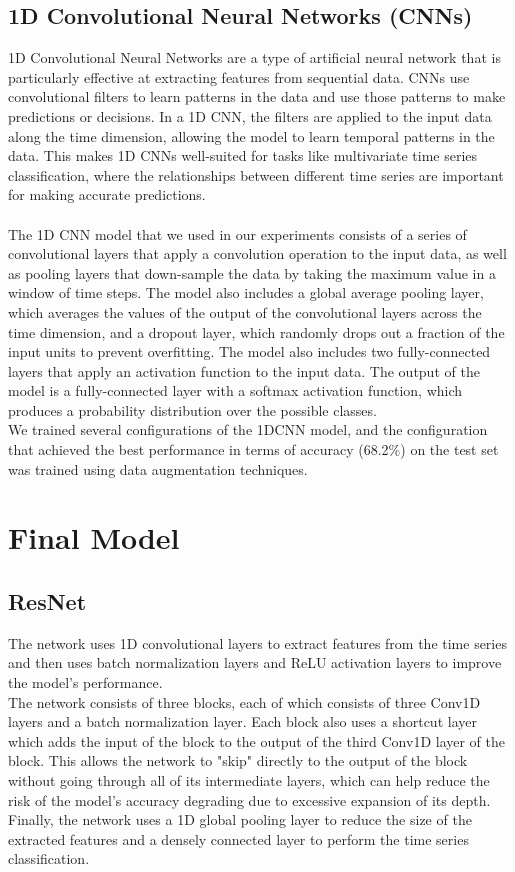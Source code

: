 \documentclass[11pt, oneside]{article}
\begin{document}
\subsection{1D Convolutional Neural Networks (CNNs)}
1D Convolutional Neural Networks are a type of artificial neural network that is particularly effective at extracting features from sequential data. CNNs use convolutional filters to learn patterns in the data and use those patterns to make predictions or decisions. In a 1D CNN, the filters are applied to the input data along the time dimension, allowing the model to learn temporal patterns in the data. This makes 1D CNNs well-suited for tasks like multivariate time series classification, where the relationships between different time series are important for making accurate predictions.\\\\
The 1D CNN model that we used in our experiments consists of a series of convolutional layers that apply a convolution operation to the input data, as well as pooling layers that down-sample the data by taking the maximum value in a window of time steps. The model also includes a global average pooling layer, which averages the values of the output of the convolutional layers across the time dimension, and a dropout layer, which randomly drops out a fraction of the input units to prevent overfitting. The model also includes two fully-connected layers that apply an activation function to the input data. The output of the model is a fully-connected layer with a softmax activation function, which produces a probability distribution over the possible classes.
\\
We trained several configurations of the 1DCNN model, and the configuration that achieved the best performance in terms of accuracy (68.2\%) on the test set was trained using data augmentation techniques.
\section{Final Model}
\subsection{ResNet}
The network uses 1D convolutional layers to extract features from the time series and then uses batch normalization layers and ReLU activation layers to improve the model's performance.\\
The network consists of three blocks, each of which consists of three Conv1D layers and a batch normalization layer. Each block also uses a shortcut layer which adds the input of the block to the output of the third Conv1D layer of the block. This allows the network to "skip" directly to the output of the block without going through all of its intermediate layers, which can help reduce the risk of the model's accuracy degrading due to excessive expansion of its depth.\\
Finally, the network uses a 1D global pooling layer to reduce the size of the extracted features and a densely connected layer to perform the time series classification.
\end{document}
